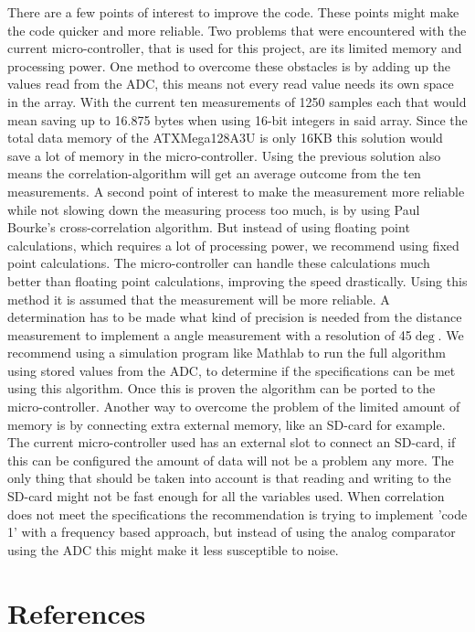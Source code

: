 \documentclass[10pt,a4paper]{article}
\begin{document}
There are a few points of interest to improve the code. These points might make the code quicker and more reliable. Two problems that were encountered with the current micro-controller, that is used for this project, are its limited memory and processing power. One method to overcome these obstacles is by adding up the values read from the ADC, this means not every read value needs its own space in the array. With the current ten measurements of 1250 samples each that would mean saving up to 16.875 bytes when using 16-bit integers in said array. Since the total data memory of the ATXMega128A3U is only 16KB this solution would save a lot of memory in the micro-controller. Using the previous solution also means the correlation-algorithm will get an average outcome from the ten measurements. A second point of interest to make the measurement more reliable while not slowing down the measuring process too much, is by using Paul Bourke's cross-correlation algorithm. But instead of using floating point calculations, which requires a lot of processing power, we recommend using fixed point calculations. The micro-controller can handle these calculations much better than floating point calculations, improving the speed drastically. Using this method it is assumed that the measurement will be more reliable. 
A determination has to be made what kind of precision is needed from the distance measurement to implement a angle measurement with a resolution of 45$\deg$.
We recommend using a simulation program like Mathlab to run the full algorithm using stored values from the ADC, to determine if the specifications can be met using this algorithm. Once this is proven the algorithm can be ported to the micro-controller. Another way to overcome the problem of the limited amount of memory is by connecting extra external memory, like an SD-card for example. The current micro-controller used has an external slot to connect an SD-card, if this can be configured the amount of data will not be a problem any more. The only thing that should be taken into account is that reading and writing to the SD-card might not be fast enough for all the variables used. When correlation does not meet the specifications the recommendation is trying to implement 'code 1' with a frequency based approach, but instead of using the analog comparator using the ADC this might make it less susceptible to noise.

\newpage






\section{References}


\end{document}
